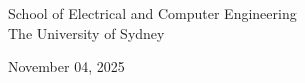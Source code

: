 \begin{titlepage}
\begin{flushleft}
\begin{center}
        School of Electrical and Computer Engineering\\
        The University of Sydney

        \vspace{0.8cm}
        
        November 04, 2025 
        
        \vspace{2cm}
        
        \end{center}
        
    \end{flushleft}

\end{titlepage}
